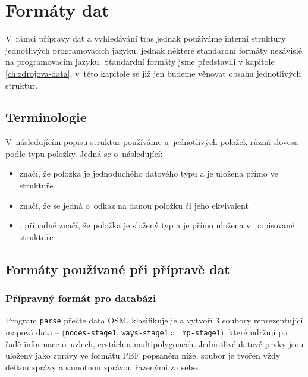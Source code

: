 \chapter{Formáty dat}
\label{ch:formaty-dat}
V~rámci přípravy dat a vyhledávání tras jednak používáme interní struktury
jednotlivých programovacích jazyků, jednak některé standardní formáty nezávislé
na programovacím jazyku. Standardní formáty jsme představili v kapitole
\ref{ch:zdrojova-data}, v~této kapitole se již jen budeme věnovat obsahu
jednotlivých struktur.


\section{Terminologie}
V~následujícím popisu struktur používáme u~jednotlivých položek různá slovesa
podle typu položky. Jedná se o~následující:
\begin{itemize}
	\item {} značí, že položka je jednoduchého datového typu a je
		uložena přímo ve struktuře
	\item {} značí, že se jedná o~odkaz na danou položku či jeho
		ekvivalent
	\item {}, případně  značí, že položka je
		složený typ a je přímo uložena v~popisované struktuře
\end{itemize}

\section{Formáty používané při přípravě dat}
\label{ch:formaty-dat:priprava}
\subsection{Přípravný formát pro databázi}
Program {\tt parse} přečte data OSM, klasifikuje je a vytvoří 3 soubory
reprezentující mapová data -- ({\tt nodes-stage1}, {\tt ways-stage1} a {\tt
mp-stage1}), které udržují po řadě
informace o~uzlech, cestách a multipolygonech. Jednotlivé datové prvky jsou
uloženy jako zprávy ve formátu PBF popsaném níže, soubor je tvořen vždy délkou
zprávy a samotnou zprávou řazenými za sebe. 

